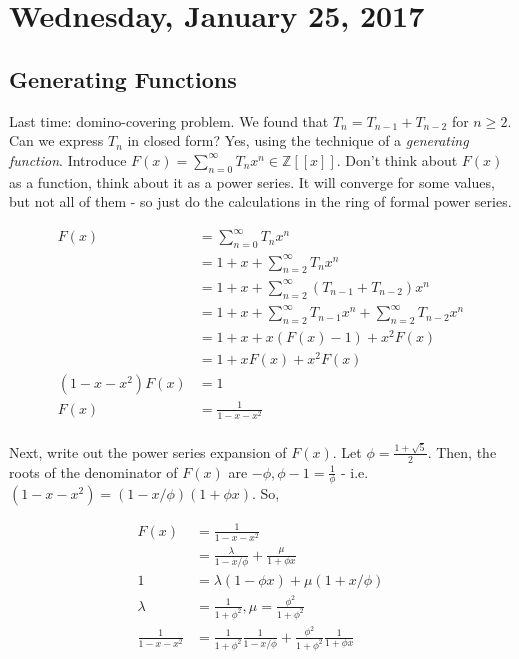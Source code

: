 \documentclass[12pt]{article}
\theoremstyle{definition}
\begin{document}
\section{Wednesday, January 25, 2017}

\subsection{Generating Functions}

Last time: domino-covering problem. We found that $T_n = T_{n-1} + T_{n-2}$ for
$n \ge 2$. Can we express $T_n$ in closed form? Yes, using the technique of a
\textit{generating function}. Introduce $F(x) = \sum_{n=0}^\infty T_nx^n \in
\mathbb{Z}[[x]]$. Don't think about $F(x)$ as a function, think about it as a
power series. It will converge for some values, but not all of them - so just
do the calculations in the ring of formal power series. 

\begin{align*}
F(x) &= \sum_{n=0}^\infty T_nx^n \\
 &= 1 + x + \sum_{n=2}^\infty T_nx^n \\
 &= 1 + x + \sum_{n=2}^\infty(T_{n-1} + T_{n-2})x^n \\
 &= 1 + x + \sum_{n=2}^\infty T_{n-1}x^n + \sum_{n=2}^\infty T_{n-2}x^n\\
 &= 1 + x + x(F(x) - 1) + x^2F(x)\\
 &= 1 + xF(x) + x^2F(x) \\
 (1 - x - x^2)F(x) &= 1 \\
 F(x) &= \frac{1}{1-x-x^2}\\
\end{align*}

Next, write out the power series expansion of $F(x)$. Let $\phi = \frac{1
    +\sqrt{5}}{2}$. Then, the roots of the denominator of $F(x)$ are $-\phi,
    \phi - 1 = \frac{1}{\phi}$ - i.e. $(1 - x - x^2) = (1 - x/\phi)(1 + \phi
    x)$. So, 

\begin{align*}
F(x) &= \frac{1}{1 - x - x^2}\\
&= \frac{\lambda}{1 - x/\phi} + \frac{\mu}{1 + \phi x}\\
1 &= \lambda(1 - \phi x ) + \mu(1 + x/\phi)\\
\lambda &= \frac{1}{1 + \phi^2}, \mu = \frac{\phi^2}{1 + \phi^2}\\
\frac{1}{1-x-x^2} &= \frac{1}{1 + \phi^2} \frac{1}{1 - x/\phi} +
\frac{\phi^2}{1 + \phi^2} \frac{1}{1 + \phi x}
\end{align*}
\end{document}
